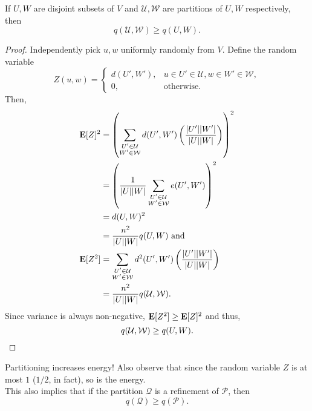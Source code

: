 			\begin{lemma}
				\label{lemma: szemeredi lemma energy increases on partitioning}
				If $U,W$ are disjoint subsets of $V$ and $\mathcal{U},\mathcal{W}$ are partitions of $U,W$ respectively, then
				\[ q(\mathcal{U},\mathcal{W}) \ge q(U,W). \]
			\end{lemma}

			\begin{proof}
				Independently pick $u,w$ uniformly randomly from $V$. Define the random variable
				\[ Z(u,w) =
				\begin{cases}
					d(U', W'), & u \in U' \in \mathcal{U}, w \in W' \in \mathcal{W}, \\
					0, & \text{otherwise.}
				\end{cases}
				\]
				Then,
				\begin{align*}
					\textbf{E}[Z]^2 &= \left(\sum_{\substack{U' \in \mathcal{U} \\ W' \in \mathcal{W}}} d(U',W') \left(\frac{|U'||W'|}{|U||W|}\right)\right)^2 \\
						&= \left(\frac{1}{|U||W|} \sum_{\substack{U' \in \mathcal{U} \\ W' \in \mathcal{W}}} e(U',W')\right)^2 \\
						&= d(U,W)^2 \\
						&= \frac{n^2}{|U||W|} q(U,W) \text{ and} \\
					\textbf{E}[Z^2] &= \sum_{\substack{U' \in \mathcal{U} \\ W' \in \mathcal{W}}} d^2(U',W') \left(\frac{|U'||W'|}{|U||W|}\right) \\
						&= \frac{n^2}{|U||W|} q(\mathcal{U},\mathcal{W}).
				\end{align*}
				Since variance is always non-negative, $\textbf{E}[Z^2] \ge \textbf{E}[Z]^2$ and thus,
				\[ q(\mathcal{U},\mathcal{W}) \ge q(U,W). \qedhere \]
			\end{proof}

			Partitioning increases energy! Also observe that since the random variable $Z$ is at most $1$ ($1/2$, in fact), so is the energy.\\
			This also implies that if the partition $\mathcal{Q}$ is a refinement of $\mathcal{P}$, then
			\[ q(\mathcal{Q}) \ge q(\mathcal{P}). \]

